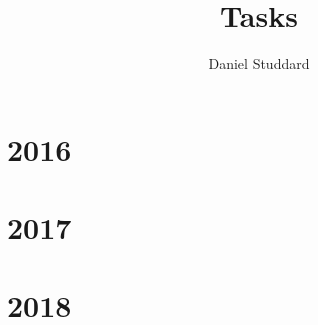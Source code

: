 \documentclass{report}
\author{Daniel Studdard}
\begin{document}
\title{Tasks}
\maketitle
\tableofcontents

\chapter{2016}













\chapter{2017}













\chapter{2018}












\end{document}
